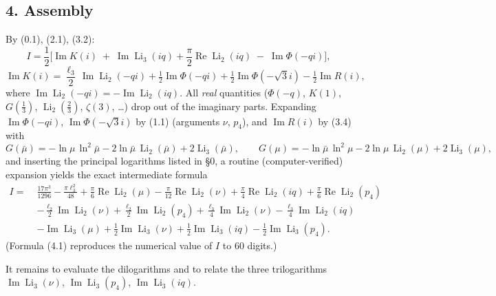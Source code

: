 \documentclass[11pt]{article}
\theoremstyle{remark}
\begin{document}
\subsection*{4. Assembly}

By (0.1), (2.1), (3.2):
\[
I=\frac12\Big[\operatorname{Im}K(i)\;+\;\operatorname{Im}\operatorname{Li}_3(iq)+\frac\pi2\operatorname{Re}\operatorname{Li}_2(iq)\;-\;\operatorname{Im}\Phi(-qi)\Big],
\]
\[
\operatorname{Im}K(i)=\frac{\ell_3}{2}\,\operatorname{Im}\operatorname{Li}_2(-qi)
+\tfrac12\operatorname{Im}\Phi(-qi)+\tfrac12\operatorname{Im}\Phi(-\sqrt3 i)-\tfrac12\operatorname{Im}R(i),
\]
where $\operatorname{Im}\operatorname{Li}_2(-qi)=-\operatorname{Im}\operatorname{Li}_2(iq)$. All \textit{real} quantities ($\Phi(-q)$, $K(1)$, $G(\tfrac13)$, $\operatorname{Li}_2(\tfrac23)$, $\zeta(3)$, \ldots) drop out of the imaginary parts. Expanding $\operatorname{Im}\Phi(-qi)$, $\operatorname{Im}\Phi(-\sqrt3i)$ by (1.1) (arguments $\nu$, $p_4$), and $\operatorname{Im}R(i)$ by (3.4) with
\[
G(\bar\mu)=-\ln\mu\,\ln^2\bar\mu-2\ln\bar\mu\,\operatorname{Li}_2(\bar\mu)+2\operatorname{Li}_3(\bar\mu),\qquad
G(\mu)=-\ln\bar\mu\,\ln^2\mu-2\ln\mu\,\operatorname{Li}_2(\mu)+2\operatorname{Li}_3(\mu),
\]
and inserting the principal logarithms listed in \S0, a routine (computer-verified) expansion yields the exact intermediate formula
\begin{equation*}
\begin{aligned}
I=\;&\frac{17\pi^3}{1296}-\frac{\pi\ell_3^2}{48}
+\frac{\pi}{6}\operatorname{Re}\operatorname{Li}_2(\mu)
-\frac{\pi}{12}\operatorname{Re}\operatorname{Li}_2(\nu)
+\frac{\pi}{4}\operatorname{Re}\operatorname{Li}_2(iq)
+\frac{\pi}{6}\operatorname{Re}\operatorname{Li}_2(p_4)\\[1mm]
&-\frac{\ell_2}{2}\operatorname{Im}\operatorname{Li}_2(\nu)
+\frac{\ell_2}{2}\operatorname{Im}\operatorname{Li}_2(p_4)
+\frac{\ell_3}{4}\operatorname{Im}\operatorname{Li}_2(\nu)
-\frac{\ell_3}{4}\operatorname{Im}\operatorname{Li}_2(iq)\\[1mm]
&-\operatorname{Im}\operatorname{Li}_3(\mu)
+\frac12\operatorname{Im}\operatorname{Li}_3(\nu)
+\frac12\operatorname{Im}\operatorname{Li}_3(iq)
-\frac12\operatorname{Im}\operatorname{Li}_3(p_4).
\end{aligned} \tag{4.1}
\end{equation*}
(Formula (4.1) reproduces the numerical value of $I$ to $60$ digits.)

It remains to evaluate the dilogarithms and to relate the three trilogarithms
$\operatorname{Im}\operatorname{Li}_3(\nu)$, $\operatorname{Im}\operatorname{Li}_3(p_4)$, $\operatorname{Im}\operatorname{Li}_3(iq)$.
\end{document}
